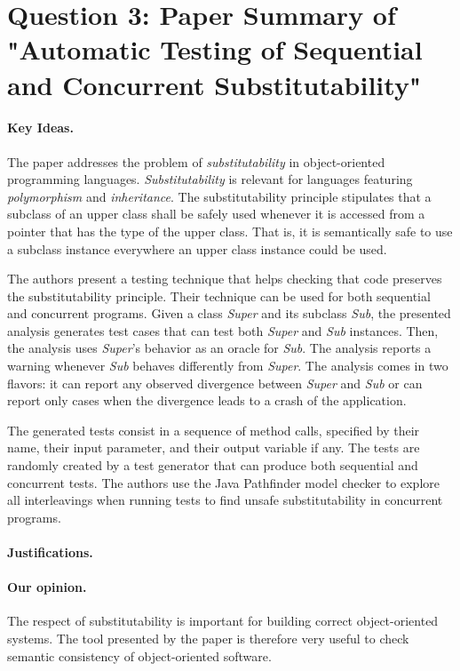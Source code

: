 \section*{Question 3: Paper Summary of "Automatic Testing of Sequential and Concurrent Substitutability"}

\newcommand{\mysub}{substitutability}
\newcommand{\mySub}{Substitutability}

\paragraph{Key Ideas.}
The paper addresses the problem of \textit{\mysub} in 
object-oriented programming languages. \textit{\mySub} is relevant
for languages featuring \textit{polymorphism} and \textit{inheritance}.
The \mysub{} principle stipulates that a subclass of an upper
class shall be safely used whenever it is accessed from a
pointer that has the type of the upper class. That is, it is
semantically safe to use a subclass instance everywhere an
upper class instance could be used.

The authors present a testing technique that helps checking
that code preserves the \mysub{} principle. Their technique
can be used for both sequential and concurrent programs.
Given a class \textit{Super} and its subclass \textit{Sub}, the
presented analysis generates test cases that can test both
\textit{Super} and \textit{Sub} instances. Then, the analysis
uses \textit{Super}'s behavior as an oracle for \textit{Sub}.
The analysis reports a warning whenever \textit{Sub} behaves
differently from \textit{Super}. The analysis comes in two
flavors: it can report any observed divergence between \textit{Super}
and \textit{Sub} or can report only cases when the divergence 
leads to a crash of the application.

The generated tests consist in a sequence of method calls,
specified by their name, their input parameter, and their
output variable if any. The tests are randomly created by
a test generator that can produce both sequential and
concurrent tests. The authors use the Java Pathfinder
model checker to explore all interleavings when running
tests to find unsafe \mysub{} in concurrent programs.

\paragraph{Justifications.}


\paragraph{Our opinion.}
The respect of \mysub{} is important for building correct
object-oriented systems. The tool presented by the paper
is therefore very useful to check semantic consistency of
object-oriented software.

